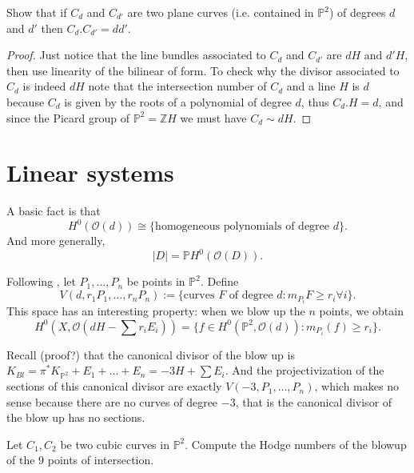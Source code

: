 \begin{exercise}[Bézout]
\label{exercise-bezout}
Show that if $C_d$ and $C_{d'}$ are two plane curves
(i.e. contained in $\mathbb{P}^2$)
of degrees $d$ and $d'$ then
$C_d.C_{d'}=dd'$.
\end{exercise}

\begin{proof}
Just notice that the line bundles associated to
$C_d$ and $C_{d'}$ are $dH$ and $d'H$,
then use linearity of the bilinear of form.
To check why the divisor associated to $C_d$
is indeed $dH$ note that the intersection number
of $C_d$ and a line $H$ is $d$ because $C_d$
is given by the roots of a polynomial of degree $d$,
thus $C_d.H=d$, and since the Picard group of $\mathbb{P}^2=\mathbb{Z}H$
we must have $C_d \sim dH$.
\end{proof}

\section{Linear systems}
\label{section-linear-systems}

\noindent
A basic fact is that
$$
H^0(\mathcal{O}(d)) \cong
\{\text{homogeneous polynomials of degree $d$}\}.
$$
And more generally,
$$
|D|=\mathbb{P}H^0(\mathcal{O}(D)).
$$

\medskip\noindent
Following \cite[Section 5.2]{Fulton}, let
$P_1,…,P_n$ be points in $\mathbb{P}^2$. Define
$$
V(d,r_1P_1,…,r_nP_n):=
\{\text{curves $F$ of degree $d$}:
m_{P_i}F\geq r_i\forall i\}.
$$
This space has an interesting property:
when we blow up the $n$ points, we obtain 
$$
H^0(X,\mathcal{O}(dH-\sum r_iE_i))
=
\{f \in H^0(\mathbb{P}^2,\mathcal{O}(d)):m_{P_i}(f) \geq  r_i\}.
$$

Recall (proof?) that the canonical divisor of the blow up is
$K_{Bl}=\pi^* K_{\mathbb{P}^2}+E_1+…+E_n=-3H + \sum E_i$.
And the projectivization of the sections of this canonical divisor
are exactly $V(-3,P_1,…,P_n)$, which makes
no sense because there are no curves of degree $-3$,
that is the canonical divisor of the blow up has no sections.

\begin{exercise}
\label{exercise-hodge-numbers-blow-up-9pts}
Let $C_1,C_2$ be two cubic curves in $\mathbb{P}^2$.
Compute the Hodge numbers of the blowup of the 9 points
of intersection.
\end{exercise}

